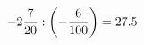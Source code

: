 \documentclass[preview]{standalone}
\begin{document}
\begin{align*}
-2 { 7 \over 20 }  :  \left( - { 6 \over 100 } \right) = 27.5
\end{align*}
\end{document}
